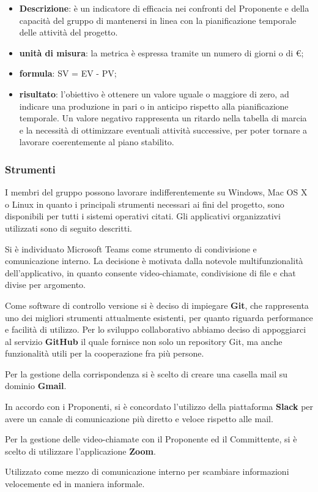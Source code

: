 		\begin{itemize}
			\item \textbf{Descrizione}: è un indicatore di efficacia nei confronti del Proponente e della capacità del gruppo di mantenersi in linea con la pianificazione temporale delle attività del progetto.
			\item \textbf{unità di misura}: la metrica è espressa tramite un numero di giorni o di \euro;
			\item \textbf{formula}: SV = EV - PV;
			\item \textbf{risultato}: l'obiettivo è ottenere un valore uguale o maggiore di zero, ad indicare una produzione in pari o in anticipo rispetto alla pianificazione temporale. Un valore negativo rappresenta un ritardo nella tabella di marcia e la necessità di ottimizzare eventuali attività successive, per poter tornare a lavorare coerentemente al piano stabilito.
		\end{itemize}
		\subsubsection{Strumenti}
			I membri del gruppo \Gruppo{} possono lavorare indifferentemente su Windows, Mac OS X o Linux in quanto i principali strumenti necessari ai fini del progetto, sono disponibili per tutti i sistemi operativi citati. Gli applicativi organizzativi utilizzati sono di seguito descritti.
			
				Si è individuato Microsoft Teams come strumento di condivisione e comunicazione interno. La decisione è motivata dalla notevole multifunzionalità dell'applicativo, in quanto consente video-chiamate, condivisione di file e chat divise per argomento.
				
				Come software di controllo versione si è deciso di impiegare \textbf{Git}, che rappresenta uno dei migliori strumenti attualmente esistenti, per quanto riguarda performance e facilità di utilizzo. Per lo sviluppo collaborativo abbiamo deciso di appoggiarci al servizio \textbf{GitHub} il quale fornisce non solo un repository\ped{\textit{G}} Git, ma anche funzionalità utili per la cooperazione fra più persone.
							
				Per la gestione della corrispondenza si è scelto di creare una casella mail su dominio \textbf{Gmail}.
				
				In accordo con i Proponenti, si è concordato l'utilizzo della piattaforma \textbf{Slack} per avere un canale di comunicazione più diretto e veloce rispetto alle mail.
			
				Per la gestione delle video-chiamate con il Proponente ed il Committente, si è scelto di utilizzare l'applicazione \textbf{Zoom}.
				
				Utilizzato come mezzo di comunicazione interno per scambiare informazioni velocemente ed in maniera informale.
	